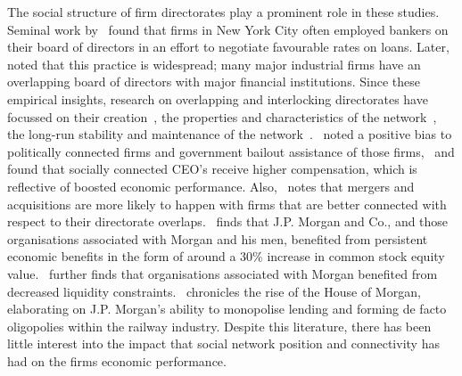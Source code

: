 The social structure of firm directorates play a prominent role in these studies. Seminal work by~\citet{Dooley1969} found that firms in New York City often employed bankers on their board of directors in an effort to negotiate favourable rates on loans. Later,~\citet{Levine1972} noted that this practice is widespread; many major industrial firms have an overlapping board of directors with major financial institutions. Since these empirical insights, research on overlapping and interlocking directorates have focussed on their creation~\citep{PfefferSalancik1978}, the properties and characteristics of the network~\citep{DavisYooBaker2003}, the long-run stability and maintenance of the network~\citep{BeckmanHaunschildPhillips2004}.~\citet{FaccioMcConnellMasulis2006} noted a positive bias to politically connected firms and government bailout assistance of those firms,~\citet{HwangKim2009} and \citet{HwangKim2012} found that socially connected CEO's receive higher compensation, which is reflective of boosted economic performance. Also,~\citet{StuartYim2010} notes that mergers and acquisitions are more likely to happen with firms that are better connected with respect to their directorate overlaps.~\citet{deLong1991} finds that J.P. Morgan and Co., and those organisations associated with Morgan and his men, benefited from persistent economic benefits in the form of around a $30\%$ increase in common stock equity value.~\citet{Ramirez1995} further finds that organisations associated with Morgan benefited from decreased liquidity constraints.~\citet{Chernow2010} chronicles the rise of the House of Morgan, elaborating on J.P. Morgan's ability to monopolise lending and forming de facto oligopolies within the railway industry. Despite this literature, there has been little interest into the impact that social network position and connectivity has had on the firms economic performance.

